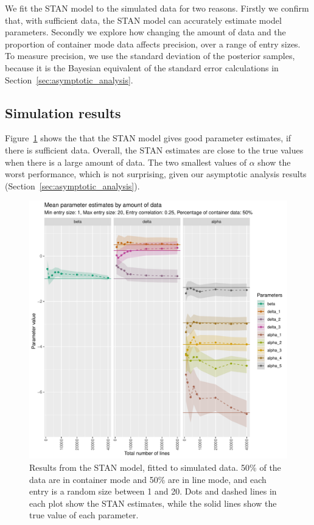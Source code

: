 \documentclass[useAMS,usenatbib,referee]{biom}
\begin{document}
We fit the STAN model to the simulated data for two reasons. Firstly we confirm that, with sufficient data, the STAN model can accurately estimate model parameters. Secondly we explore how changing the amount of data and the proportion of container mode data affects precision, over a range of entry sizes. To measure precision, we use the standard deviation of the posterior samples, because it is the Bayesian equivalent of the standard error calculations in Section~\ref{sec:asymptotic_analysis}.

\subsection{Simulation results}

Figure~\ref{fig:simulation_estimation} shows the that the STAN model gives good parameter estimates, if there is sufficient data. Overall, the STAN estimates are close to the true values when there is a large amount of data. The two smallest values of \(\alpha\) show the worst performance, which is not surprising, given our asymptotic analysis results (Section~\ref{sec:asymptotic_analysis}).  

\begin{figure}[h!]
\includegraphics[width=\textwidth]{simulation_estimates_random_effect.pdf}
\caption{Results from the STAN model, fitted to simulated data. 50\% of the data are in container mode and 50\% are in line mode, and each entry is a random size between 1 and 20. Dots and dashed lines in each plot show the STAN estimates, while the solid lines show the true value of each parameter.}
\label{fig:simulation_estimation}
\end{figure}
\end{document}
